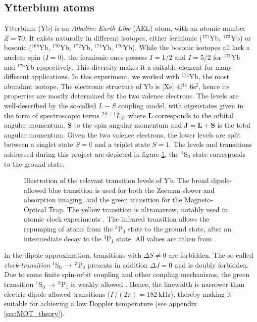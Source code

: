 \documentclass[11pt]{article}
\numberwithin{equation}{section}
\numberwithin{figure}{section}
\begin{document}
\subsection{Ytterbium atoms}
\label{sec:Yb}

Ytterbium (Yb) is an \emph{Alkaline-Earth-Like} (AEL) atom, with an atomic number $Z=70$. It exists naturally in different isotopes, either fermionic ($^{171}$Yb, $^{173}$Yb) or bosonic ($^{168}$Yb, $^{170}$Yb, $^{172}$Yb, $^{174}$Yb, $^{176}$Yb). While the bosonic isotopes all lack a nuclear spin ($I=0$), the fermionic ones possess $I=1/2$ and $I=5/2$ for $^{171}$Yb and $^{173}$Yb respectively. This diversity makes it a suitable element for many different applications. In this experiment, we worked with $^{174}$Yb, the most abundant isotope. 
The electronic structure of Yb is [Xe] 4f$^{14}$ 6s$^2$, hence its properties are mostly determined by the two valence electrons. The levels are well-described by the so-called $L-S$ coupling model, with eigenstates given in the form of spectroscopic terms $^{2S+1}L_J$, where $\mathbf{L}$ corresponds to the orbital angular momentum, $\mathbf{S}$ to the spin angular momentum and $\mathbf{J} = \mathbf{L} + \mathbf{S}$ is the total angular momentum. Given the two valence electrons, the lower levels are split between a singlet state $S=0$ and a triplet state $S=1$. The levels and transitions addressed during this project are depicted in figure \ref{fig:Yb}, the $^1$S$_0$ state corresponds to the ground state.

%
\begin{figure}[htbp]
	\centering
	\def\svgwidth{0.65\linewidth}
    
	\caption{\small Illustration of the relevant transition levels of Yb. The broad dipole-allowed blue transition is used for both the Zeeman slower and absorption imaging, and the green transition for the Magneto-Optical Trap.  The yellow transition is ultranarrow, notably used in atomic clock experiments \citep{2008_poli}. The infrared transition allows the repumping of atoms from the $^3$P$_0$ state to the ground state, after an intermediate decay to the $^3$P$_1$ state. All values are taken from \cite{2015_scazza}.}
    \label{fig:Yb}
\end{figure}
%

In the dipole approximation, transitions with $\Delta S \ne 0$ are forbidden. The so-called \emph{clock-transition} $^1$S$_0 \, \rightarrow \, ^3$P$_0$ presents in addition $\Delta J = 0$ and is doubly forbidden. Due to some finite spin-orbit coupling and other coupling mechanisms, the green transition $^1$S$_0 \, \rightarrow \, ^3$P$_1$ is weakly allowed \citep{1962_lurio}. Hence, the linewidth is narrower than electric-dipole allowed transitions ($\Gamma / (2\pi) = \SI{182}{\kilo\hertz}$), thereby making it suitable for achieving a low Doppler temperature (see appendix \ref{sec:MOT_theory}). 
\end{document}

